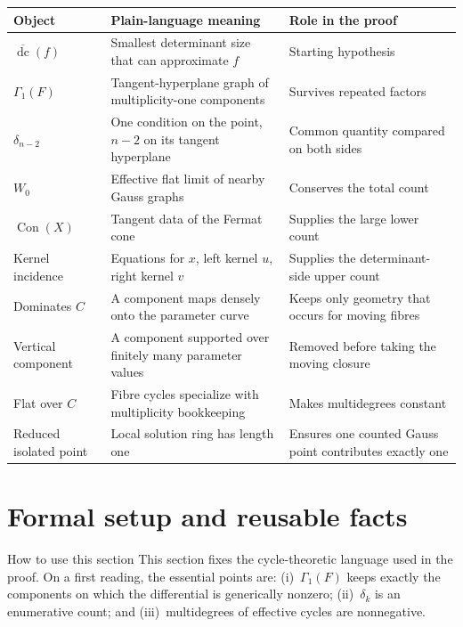 \documentclass[acmsmall,screen,nonacm]{acmart}
\theoremstyle{definition}
\theoremstyle{remark}
\DeclareMathOperator{\dc}{dc}
\DeclareMathOperator{\Con}{Con}
\newcommand{\pdeg}{\delta}
\newcommand{\dcb}{\overline{\dc}}
\newcommand{\Gone}{\Gamma_{\!1}}
\begin{document}
\begin{center}
\small
\begin{tabularx}{\textwidth}{@{}p{}X p{}@{}}
\toprule
Object & Plain-language meaning & Role in the proof \\
\midrule
$\dcb(f)$ & Smallest determinant size that can approximate $f$ & Starting hypothesis \\
$\Gone(F)$ & Tangent-hyperplane graph of multiplicity-one components & Survives repeated factors \\
$\pdeg_{n-2}$ & One condition on the point, $n-2$ on its tangent hyperplane & Common quantity compared on both sides \\
$W_0$ & Effective flat limit of nearby Gauss graphs & Conserves the total count \\
$\Con(X)$ & Tangent data of the Fermat cone & Supplies the large lower count \\
Kernel incidence & Equations for $x$, left kernel $u$, right kernel $v$ & Supplies the determinant-side upper count \\
Dominates $C$ & A component maps densely onto the parameter curve & Keeps only geometry that occurs for moving fibres \\
Vertical component & A component supported over finitely many parameter values & Removed before taking the moving closure \\
Flat over $C$ & Fibre cycles specialize with multiplicity bookkeeping & Makes multidegrees constant \\
Reduced isolated point & Local solution ring has length one & Ensures one counted Gauss point contributes exactly one \\
\bottomrule
\end{tabularx}
\end{center}

\section{Formal setup and reusable facts}\label{sec:prelim}

\begin{readerbox}{How to use this section}
This section fixes the cycle-theoretic language used in the proof.  On a first reading, the essential points are: (i)~$\Gone(F)$ keeps exactly the components on which the differential is generically nonzero; (ii)~$\pdeg_k$ is an enumerative count; and (iii)~multidegrees of effective cycles are nonnegative.
\end{readerbox}
\end{document}
